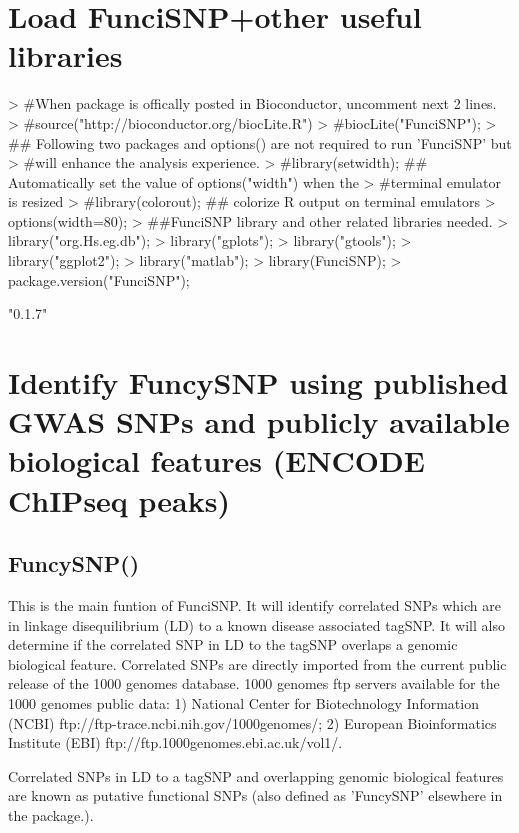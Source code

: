\documentclass[a4paper]{article}
\begin{document}
\section*{Load FunciSNP+other useful libraries}
\begin{Schunk}
\begin{Sinput}
> #When package is offically posted in Bioconductor, uncomment next 2 lines.
> #source("http://bioconductor.org/biocLite.R")
> #biocLite("FunciSNP");
> ## Following two packages and options() are not required to run 'FunciSNP' but 
> #will enhance the analysis experience.
> #library(setwidth); ## Automatically set the value of options("width") when the 
> #terminal emulator is resized
> #library(colorout); ## colorize R output on terminal emulators
> options(width=80);
> ##FunciSNP library and other related libraries needed.
> library("org.Hs.eg.db");
> library("gplots");
> library("gtools");
> library("ggplot2");
> library("matlab");
> library(FunciSNP);
> package.version("FunciSNP");
\end{Sinput}
\begin{Soutput}
[1] "0.1.7"
\end{Soutput}
\end{Schunk}

\section*{Identify FuncySNP using published GWAS SNPs and publicly available 
biological features (ENCODE ChIPseq peaks)}
\subsection*{FuncySNP()}
This is the main funtion of FunciSNP. It will identify correlated SNPs which are
 in linkage disequilibrium (LD) to a known disease associated tagSNP. It will 
also determine if the correlated SNP in LD to the tagSNP overlaps a genomic 
biological feature. Correlated SNPs are directly imported from the current 
public release of the 1000 genomes database. 1000 genomes ftp servers available 
for the 1000 genomes public data: 1) National Center for Biotechnology 
Information (NCBI) ftp://ftp-trace.ncbi.nih.gov/1000genomes/; 2) European 
Bioinformatics Institute (EBI) ftp://ftp.1000genomes.ebi.ac.uk/vol1/.

Correlated SNPs in LD to a tagSNP and overlapping genomic biological features 
are known as putative functional SNPs (also defined as 'FuncySNP' elsewhere in
 the package.).
\end{document}
